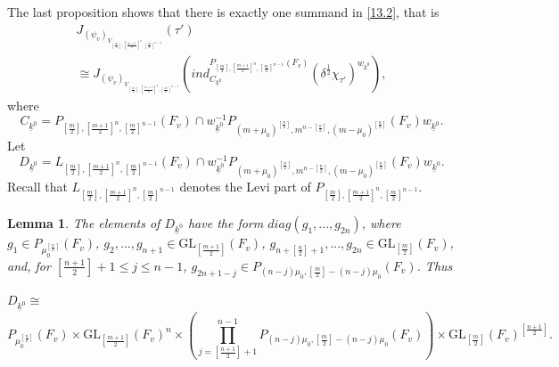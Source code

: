\documentclass[12pts]{amsart}
\newcommand{\GL}{{\mathrm{GL}}}
\newtheorem{lem}[thm]{Lemma}
\begin{document}
The last proposition shows that there is exactly one summand in \eqref{13.2}, that is
\begin{multline}\label{13.12}
J_{(\psi_v)_{V_{[\frac{m}{2}],[\frac{m+1}{2}]^n,[\frac{m}{2}]^{n-1}}}}(\tau')\\
\cong 
J_{(\psi_v)_{V_{[\frac{m}{2}],[\frac{m+1}{2}]^n,[\frac{m}{2}]^{n-1}}}}(ind^{P_{[\frac{m}{2}],[\frac{m+1}{2}]^n,[\frac{m}{2}]^{n-1}}(F_v)}_{C_{\underline{k}^0}}(\delta^{\frac{1}{2}}\chi_{\tau'})^{w_{\underline{k}^0}}),
\end{multline}
where
$$
C_{\underline{k}^0}=P_{[\frac{m}{2}],[\frac{m+1}{2}]^n,[\frac{m}{2}]^{n-1}}(F_v)\cap w_{\underline{k}^0}^{-1}P_{(m+\mu_0)^{[\frac{n}{2}]},m^{n-[\frac{n}{2}]}, (m-\mu_0)^{[\frac{n}{2}]}}(F_v)w_{\underline{k}^0}.
$$	  	
Let
$$
D_{\underline{k}^0}=L_{[\frac{m}{2}],[\frac{m+1}{2}]^n,[\frac{m}{2}]^{n-1}}(F_v)\cap w_{\underline{k}^0}^{-1}P_{(m+\mu_0)^{[\frac{n}{2}]},m^{n-[\frac{n}{2}]}, (m-\mu_0)^{[\frac{n}{2}]}}(F_v)w_{\underline{k}^0}.
$$	  		
Recall that $L_{[\frac{m}{2}],[\frac{m+1}{2}]^n,[\frac{m}{2}]^{n-1}}$ denotes the Levi part of $P_{[\frac{m}{2}],[\frac{m+1}{2}]^n,[\frac{m}{2}]^{n-1}}$.
\begin{lem}\label{lem 13.3}
The elements of $D_{\underline{k}^0}$ have the form $diag(g_1,...,g_{2n})$, where\\ 
$ g_1\in P_{\mu_0^{[\frac{n}{2}]}}(F_v)$, $g_2,...,g_{n+1}\in \GL_{[\frac{m+1}{2}]}(F_v)$, $g_{n+[\frac{n}{2}]+1},...,g_{2n}\in \GL_{[\frac{m}{2}]}(F_v)$,\\
and, for $[\frac{n+1}{2}]+1\leq j\leq n-1$, $g_{2n+1-j}\in P_{(n-j)\mu_0, [\frac{m}{2}]-(n-j)\mu_0}(F_v)$. Thus\\
\\
$D_{\underline{k}^0}\cong$
 $$
   P_{\mu_0^{[\frac{n}{2}]}}(F_v)\times \GL_{[\frac{m+1}{2}]}(F_v)^{n}\times (\prod_{j=[\frac{n+1}{2}]+1}^{n-1}P_{(n-j)\mu_0, [\frac{m}{2}]-(n-j)\mu_0}(F_v))\times \GL_{[\frac{m}{2}]}(F_v)^{[\frac{n+1}{2}]}.
 $$ 
\end{lem}
\end{document}
